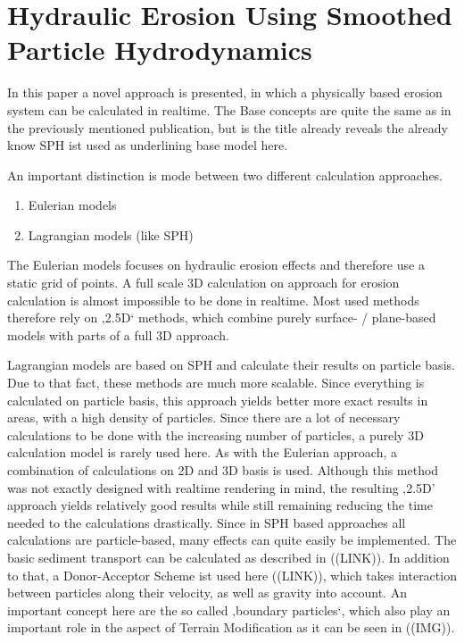 \section{Hydraulic Erosion Using Smoothed Particle Hydrodynamics}
\cite{krivstof2009hydraulic}
In this paper a novel approach is presented, in which a physically based erosion system can be calculated in realtime. The Base concepts are quite the same as in the previously mentioned publication, but is the title already reveals the already know SPH ist used as underlining base model here.

An important distinction is mode between two different calculation approaches. 
\begin{enumerate}
	\item Eulerian models
	\item Lagrangian models (like SPH)
\end{enumerate}

The Eulerian models focuses on hydraulic erosion effects and therefore use a static grid of points. A full scale 3D calculation on approach for erosion calculation is almost impossible to be done in realtime. Most used methods therefore rely on ‚2.5D‘ methods, which combine purely surface- / plane-based models with parts of a full 3D approach.

Lagrangian models are based on SPH and calculate their results on particle basis. Due to that fact, these methods are much more scalable. Since everything is calculated on particle basis, this approach yields better more exact results in areas, with a high density of particles. Since there are a lot of necessary calculations to be done with the increasing number of particles, a purely 3D calculation model is rarely used here. As with the Eulerian approach, a combination of calculations on 2D and 3D basis is used. Although this method was not exactly designed with realtime rendering in mind, the resulting ‚2.5D’ approach yields relatively good results while still remaining reducing the time needed to the calculations drastically.
Since in SPH based approaches all calculations are particle-based, many effects can quite easily be implemented. The basic sediment transport can be calculated as described in ((LINK)). In addition to that, a Donor-Acceptor Scheme ist used here ((LINK)), which takes interaction between particles along their velocity, as well as gravity into account. An important concept here are the so called ‚boundary particles‘, which also play an important role in the aspect of Terrain Modification as it can be seen in ((IMG)).
